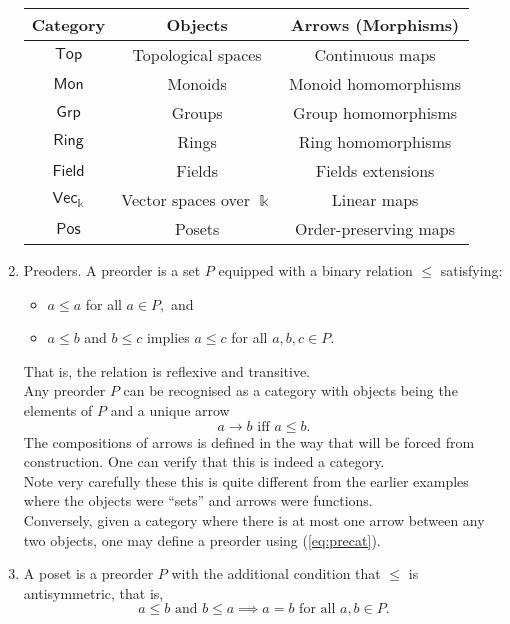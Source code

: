 \begin{enumerate}
	\begin{center}
		\begin{tabular}{|c|c|c|}
		\hline
		Category & Objects & Arrows (Morphisms)\\
		\hline
		$\mathsf{Top}$ & Topological spaces & Continuous maps\\
		$\mathsf{Mon}$ & Monoids & Monoid homomorphisms\\
		$\mathsf{Grp}$ & Groups & Group homomorphisms\\
		$\mathsf{Ring}$ & Rings & Ring homomorphisms\\
		$\mathsf{Field}$ & Fields & Fields extensions\\
		$\mathsf{Vec}_\Bbbk$ & Vector spaces over $\Bbbk$ & Linear maps\\
		$\mathsf{Pos}$ & Posets & Order-preserving maps\\
		\hline
		\end{tabular}
	\end{center}
	\item Preoders. A preorder is a set $P$ equipped with a binary relation $\le$ satisfying:
	\begin{itemize}
		\item $a \le a$ for all $a \in P,$ and
		\item $a \le b$ and $b \le c$ implies $a \le c$ for all $a, b, c \in P.$
	\end{itemize}
	That is, the relation is reflexive and transitive.\\
	Any preorder $P$ can be recognised as a category with objects being the elements of $P$ and a unique arrow 
	\begin{equation} \label{eq:precat}
		a \to b \text{ iff } a \le b.
	\end{equation}
	The compositions of arrows is defined in the way that will be forced from construction. One can verify that this is indeed a category.\\
	Note very carefully these this is quite different from the earlier examples where the objects were ``sets'' and  arrows were functions.\\
	Conversely, given a category where there is at most one arrow between any two objects, one may define a preorder using (\ref{eq:precat}).
	\item A poset is a preorder $P$ with the additional condition that $\le$ is antisymmetric, that is,
	\begin{equation*} 
		a \le b \text{ and } b \le a \implies a = b \text{ for all } a, b \in P.
	\end{equation*}

\end{enumerate}
